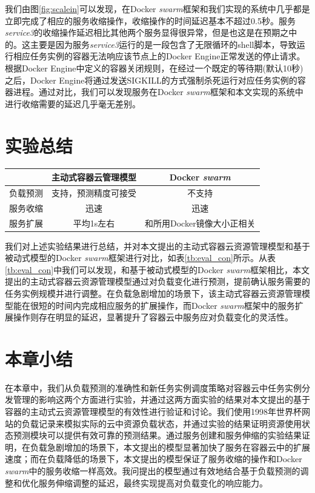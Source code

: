 我们由图\ref{fig:scalein}可以发现，在Docker \emph{swarm}框架和我们实现的系统中几乎都是立即完成了相应的服务收缩操作，收缩操作的时间延迟基本不超过0.5秒。服务\emph{service3}的收缩操作延迟相比其他两个服务显得很异常，但是也这是在预期之中的。这主要是因为服务\emph{service3}运行的是一段包含了无限循环的shell脚本，导致运行相应任务实例的容器无法响应该节点上的Docker Engine正常发送的停止请求。根据Docker Engine中定义的容器关闭规则，在经过一个既定的等待期(默认10秒)之后，Docker Engine将通过发送SIGKILL的方式强制杀死运行对应任务实例的容器进程。通过对比，我们可以发现服务在Docker \emph{swarm}框架和本文实现的系统中进行收缩需要的延迟几乎毫无差别。

\section{实验总结}
\begin{table}[H]
\centering
{}
\begin{tabular}{@{}lcc@{}}\toprule
  & 主动式容器云管理模型 & Docker \emph{swarm} \\ \midrule
 负载预测 & 支持，预测精度可接受 & 不支持 \\
 服务收缩 & 迅速 & 迅速 \\
 服务扩展 & 平均1s左右 & 和所用Docker镜像大小正相关 \\ \bottomrule
\end{tabular}
\end{table}

我们对上述实验结果进行总结，并对本文提出的主动式容器云资源管理模型和基于被动式模型的Docker \emph{swarm}框架进行对比，如表\ref{tb:eval_con}所示。从表\ref{tb:eval_con}中我们可以发现，和基于被动式模型的Docker \emph{swarm}框架相比，本文提出的主动式容器云资源管理模型通过对负载变化进行预测，提前确认服务需要的任务实例规模并进行调整。在负载急剧增加的场景下，该主动式容器云资源管理模型能在很短的时间内完成相应服务的扩展操作，而Docker \emph{swarm}框架中的服务扩展操作则存在明显的延迟，显著提升了容器云中服务应对负载变化的灵活性。

\section{本章小结}
在本章中，我们从负载预测的准确性和新任务实例调度策略对容器云中任务实例分发管理的影响这两个方面进行实验，并通过这两方面实验的结果对本文提出的基于容器的主动式云资源管理模型的有效性进行验证和讨论。我们使用1998年世界杯网站的负载记录来模拟实际的云中资源负载状态，并通过实验的结果证明资源使用状态预测模块可以提供有效可靠的预测结果。通过服务创建和服务伸缩的实验结果证明，在负载急剧增加的场景下，本文提出的模型显著加快了服务在容器云中的扩展速度；而在负载降低的场景下，本文提出的模型保证了服务收缩的操作和Docker \emph{swarm}中的服务收缩一样高效。我问提出的模型通过有效地结合基于负载预测的调整和优化服务伸缩调整的延迟，最终实现提高对负载变化的响应能力。
